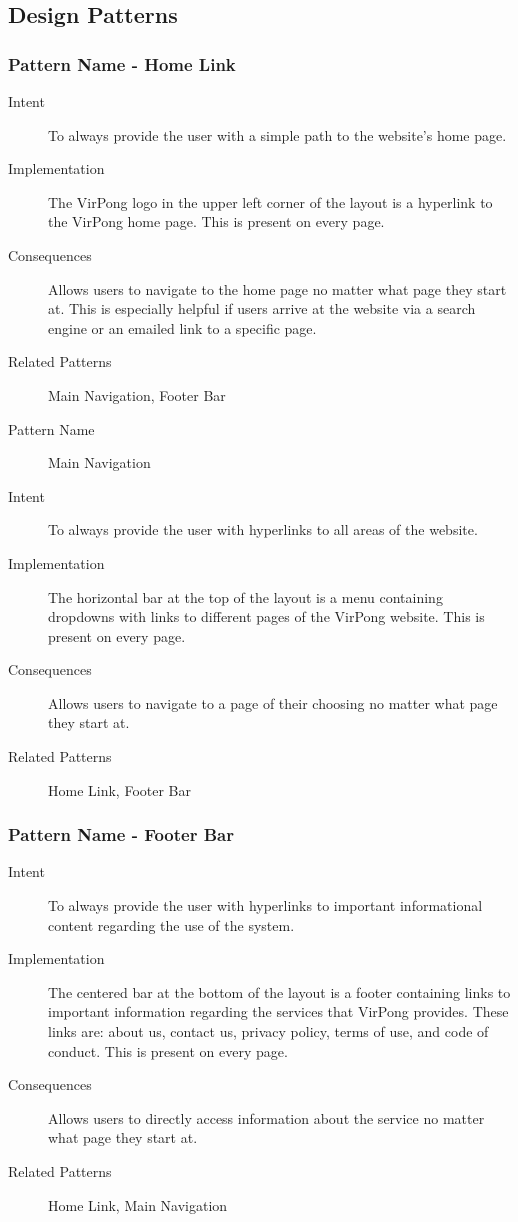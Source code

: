 %

\subsection{Design Patterns}
	\subsubsection{Pattern Name - Home Link}
		\begin{description}
		\item[Intent] To always provide the user with a simple path to the website's home page.
		\item[Implementation] The VirPong logo in the upper left corner of the layout is a hyperlink to the VirPong home page. This is present on every page.
		\item[Consequences] Allows users to navigate to the home page no matter what page they start at. This is especially helpful if users arrive at the website via a search engine or an emailed link to a specific page.
		\item[Related Patterns] Main Navigation, Footer Bar
		\item[Pattern Name] Main Navigation
		\item[Intent] To always provide the user with hyperlinks to all areas of the website.
		\item[Implementation] The horizontal bar at the top of the layout is a menu containing dropdowns with links to different pages of the VirPong website. This is present on every page.
		\item[Consequences] Allows users to navigate to a page of their choosing no matter what page they start at.
		\item[Related Patterns] Home Link, Footer Bar
	\end{description}
	\subsubsection{Pattern Name - Footer Bar}
	\begin{description}
\item[Intent] To always provide the user with hyperlinks to important informational content regarding the use of the system.
\item[Implementation] The centered bar at the bottom of the layout is a footer containing links to important information regarding the services that VirPong provides. These links are: about us, contact us, privacy policy, terms of use, and code of conduct. This is present on every page.
\item[Consequences] Allows users to directly access information about the service no matter what page they start at.
\item[Related Patterns] Home Link, Main Navigation
\end{description}
